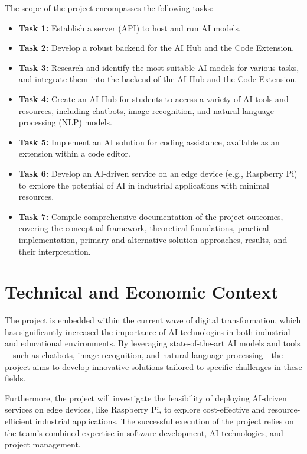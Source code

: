 The scope of the project encompasses the following tasks:
\begin{itemize}
    \item \textbf{Task 1:} Establish a server (API) to host and run AI models.
    \item \textbf{Task 2:} Develop a robust backend for the AI Hub and the Code Extension.
    \item \textbf{Task 3:} Research and identify the most suitable AI models for various tasks, and integrate them into the backend of the AI Hub and the Code Extension.
    \item \textbf{Task 4:} Create an AI Hub for students to access a variety of AI tools and resources, including chatbots, image recognition, and natural language processing (NLP) models.
    \item \textbf{Task 5:} Implement an AI solution for coding assistance, available as an extension within a code editor.
    \item \textbf{Task 6:} Develop an AI-driven service on an edge device (e.g., Raspberry Pi) to explore the potential of AI in industrial applications with minimal resources.
    \item \textbf{Task 7:} Compile comprehensive documentation of the project outcomes, covering the conceptual framework, theoretical foundations, practical implementation, primary and alternative solution approaches, results, and their interpretation.
\end{itemize}

\section{Technical and Economic Context}

The project is embedded within the current wave of digital transformation, which has significantly increased the importance of AI technologies in both industrial and educational environments. By leveraging state-of-the-art AI models and tools—such as chatbots, image recognition, and natural language processing—the project aims to develop innovative solutions tailored to specific challenges in these fields.

Furthermore, the project will investigate the feasibility of deploying AI-driven services on edge devices, like Raspberry Pi, to explore cost-effective and resource-efficient industrial applications. The successful execution of the project relies on the team’s combined expertise in software development, AI technologies, and project management.

